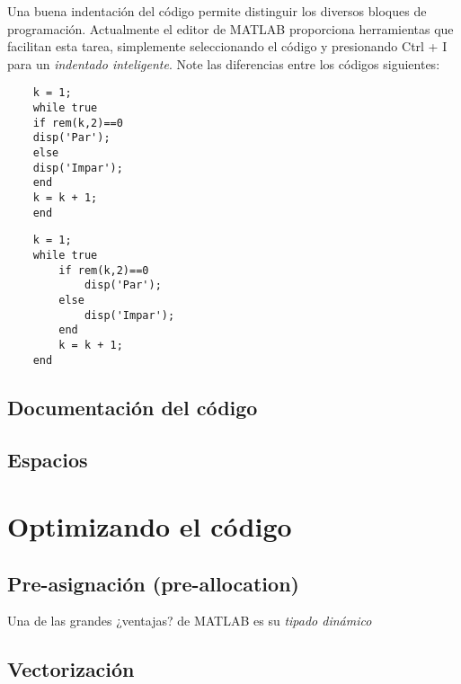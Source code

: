 Una buena indentación del código permite distinguir los diversos bloques de programación. Actualmente el editor
de MATLAB proporciona herramientas que facilitan esta tarea, simplemente seleccionando el código y presionando 
Ctrl + I para un \textit{indentado inteligente}. Note las diferencias entre los códigos siguientes:

\begin{verbatim}
	k = 1;
	while true
	if rem(k,2)==0
	disp('Par');
	else
	disp('Impar');
	end
	k = k + 1;
	end
\end{verbatim}

\begin{verbatim}
	k = 1;
	while true
	    if rem(k,2)==0
	        disp('Par');
	    else
	        disp('Impar');
	    end
	    k = k + 1;
	end
\end{verbatim}



\subsection{Documentación del código}

\subsection{Espacios}


\section{Optimizando el código}


\subsection{Pre-asignación (pre-allocation)}

Una de las grandes ¿ventajas? de MATLAB es su \textit{tipado dinámico}

\subsection{Vectorización}